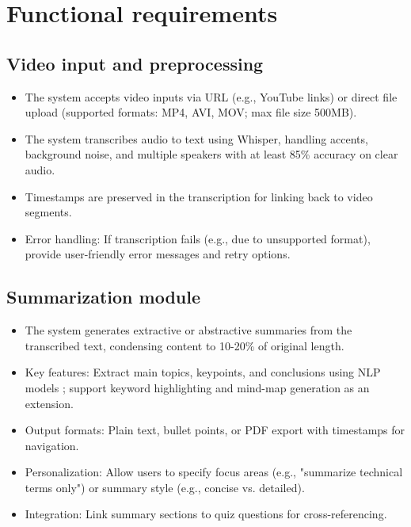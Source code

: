 \section{Functional requirements}
\subsection{Video input and preprocessing}
\begin{itemize}
    \item The system accepts video inputs via URL (e.g., YouTube links) or direct file upload (supported formats: MP4, AVI, MOV; max file size 500MB). 
    \item The system transcribes audio to text using Whisper, handling accents, background noise, and multiple speakers with at least 85\% accuracy on clear audio. 
    \item Timestamps are preserved in the transcription for linking back to video segments. 
    \item Error handling: If transcription fails (e.g., due to unsupported format), provide user-friendly error messages and retry options.
\end{itemize}

\subsection{Summarization module}
\begin{itemize}
    \item The system generates extractive or abstractive summaries from the transcribed text, condensing content to 10-20\% of original length. 
    \item Key features: Extract main topics, keypoints, and conclusions using NLP models ; support keyword highlighting and mind-map generation as an extension. 
    \item Output formats: Plain text, bullet points, or PDF export with timestamps for navigation. 
    \item Personalization: Allow users to specify focus areas (e.g., "summarize technical terms only") or summary style (e.g., concise vs. detailed).
    \item Integration: Link summary sections to quiz questions for cross-referencing.
\end{itemize}

